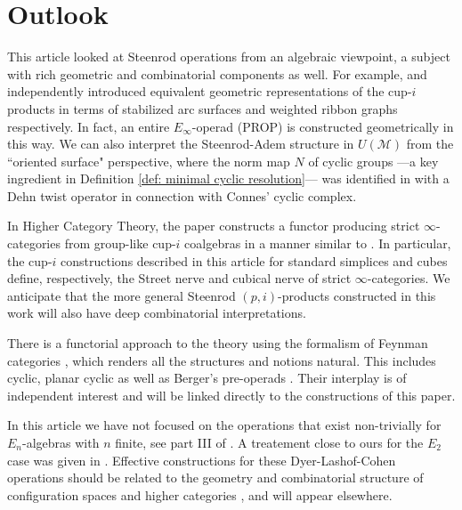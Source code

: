 
\section{Outlook}

This article looked at Steenrod operations from an algebraic viewpoint, a subject with rich geometric and combinatorial components as well. For example, \cite{Postnikov} and \cite{medina2018prop2} independently introduced equivalent geometric representations of the cup-$i$ products in terms of stabilized arc surfaces \cite{KLP} and weighted ribbon graphs respectively. In fact, an entire $E_\infty$-operad (PROP) is constructed geometrically in this way. We can also interpret the Steenrod-Adem structure in $U(\mathcal M)$ from the ``oriented surface" perspective, where the norm map $N$ of cyclic groups ---a key ingredient in Definition \ref{def: minimal cyclic resolution}--- was identified in \cite{KLP} with a Dehn twist operator in connection with Connes' cyclic complex.

In Higher Category Theory, the paper \cite{medina2020globular} constructs a functor producing strict \mbox{$\infty$-cat}egories from group-like cup-$i$ coalgebras in a manner similar to \cite{steiner2004omega}. In particular, the cup-$i$ constructions described in this article for standard simplices and cubes define, respectively, the Street nerve and cubical nerve of strict $\infty$-categories. We anticipate that the more general Steenrod $(p,i)$-products constructed in this work will also have deep combinatorial interpretations.

There is a functorial approach to the theory using the formalism of Feynman categories \cite{feynman},
which renders all the structures and notions natural. This includes cyclic, planar cyclic as well as Berger's pre-operads \cite{BergerRecog}. Their interplay is of independent interest \cite{BergerKaufmann,feyrep} and will be linked directly to the constructions of this paper.

In this article we have not focused on the operations that exist non-trivially for \mbox{$E_n$-algebras} with $n$ finite, see part III of \cite{may76homology}. A treatement close to ours for the $E_2$ case was given in \cite{Tourtchine}. Effective constructions for these Dyer-Lashof-Cohen operations should be related to the geometry and combinatorial structure of configuration spaces \cite{KZhang,sinha2013littledisks,berger04combinatorial,ayala2014configuration} and higher categories \cite{Bathigher, BalFiedSchwVogt, Rezkhigher}, and will appear elsewhere.

